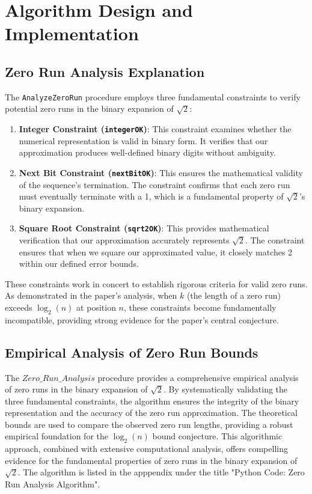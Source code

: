 \section{Algorithm Design and Implementation}

\subsection{Zero Run Analysis Explanation}
The \texttt{AnalyzeZeroRun} procedure employs three fundamental constraints to verify potential
zero runs in the binary expansion of $\sqrt{2}$:
\begin{enumerate}
    \item \textbf{Integer Constraint (\texttt{integerOK})}: This constraint examines whether the numerical
    representation is valid in binary form. It verifies that our approximation produces
    well-defined binary digits without ambiguity.
    \item \textbf{Next Bit Constraint (\texttt{nextBitOK})}: This ensures the mathematical validity of the
    sequence’s termination. The constraint confirms that each zero run must eventually
    terminate with a 1, which is a fundamental property of $\sqrt{2}$’s binary expansion.
    \item \textbf{Square Root Constraint (\texttt{sqrt2OK})}: This provides mathematical verification that
    our approximation accurately represents $\sqrt{2}$. The constraint ensures that when we
    square our approximated value, it closely matches 2 within our defined error bounds.
\end{enumerate}

These constraints work in concert to establish rigorous criteria for valid zero runs. As
demonstrated in the paper’s analysis, when $k$ (the length of a zero run) exceeds $\log_2(n)$ at
position $n$, these constraints become fundamentally incompatible, providing strong evidence
for the paper’s central conjecture.


\subsection{Empirical Analysis of Zero Run Bounds}
The \texttt{$Zero\_Run\_Analysis$} procedure provides a comprehensive empirical analysis of zero runs in the binary expansion of $\sqrt{2}$. By systematically validating the three fundamental constraints, the algorithm ensures the integrity of the binary representation and the accuracy of the zero run approximation. The theoretical bounds are used to compare the observed zero run lengths, providing a robust empirical foundation for the $\log_2(n)$ bound conjecture. This algorithmic approach, combined with extensive computational analysis, offers compelling evidence for the fundamental properties of zero runs in the binary expansion of $\sqrt{2}$.
The algorithm is listed in the apppendix under the title "Python Code: Zero Run Analysis Algorithm".

